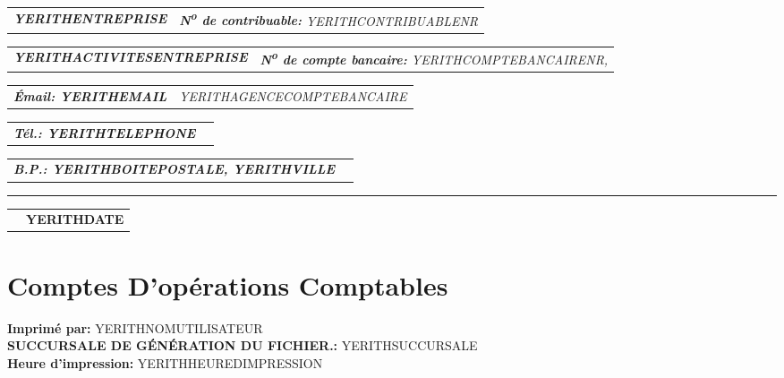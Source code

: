 \documentclass[16pt,YERITHPAPERSPEC]{article} %
\makeatletter
\newcommand{\headerrow}[2]
{\begin{tabular*}{\linewidth}{l@{\extracolsep{\fill}}r}
	#1 &
	#2 \\
\end{tabular*}}
\newcommand{\emphbold}[1]{\textbf{\emph{#1}}\xspace}
\makeatother
\begin{document}
\bigskip

\headerrow
	{\emphbold{YERITHENTREPRISE}}
	{\emph{\textbf{N\textsuperscript{o} de contribuable:} YERITHCONTRIBUABLENR}}
\headerrow
	{\emphbold{YERITHACTIVITESENTREPRISE}}
	{\emph{\textbf{N\textsuperscript{o} de compte bancaire:} YERITHCOMPTEBANCAIRENR,}}
\headerrow
	{\emphbold{\'Email: YERITHEMAIL}}
	{\emph{YERITHAGENCECOMPTEBANCAIRE}}
\headerrow
	{\emphbold{T\'el.: YERITHTELEPHONE}}
	{}
\headerrow
	{\emphbold{B.P.: YERITHBOITEPOSTALE, YERITHVILLE}}
	{}
	
\hrule

\headerrow
	{}
	{\textbf{YERITHDATE}}

\section*{Comptes D'opérations Comptables}

\textbf{Imprim\'e par:} YERITHNOMUTILISATEUR\\
\textbf{SUCCURSALE DE GÉNÉRATION DU FICHIER.:} YERITHSUCCURSALE\\
\textbf{Heure d'impression:} YERITHHEUREDIMPRESSION

\vspace{0.3cm}
\end{document}
